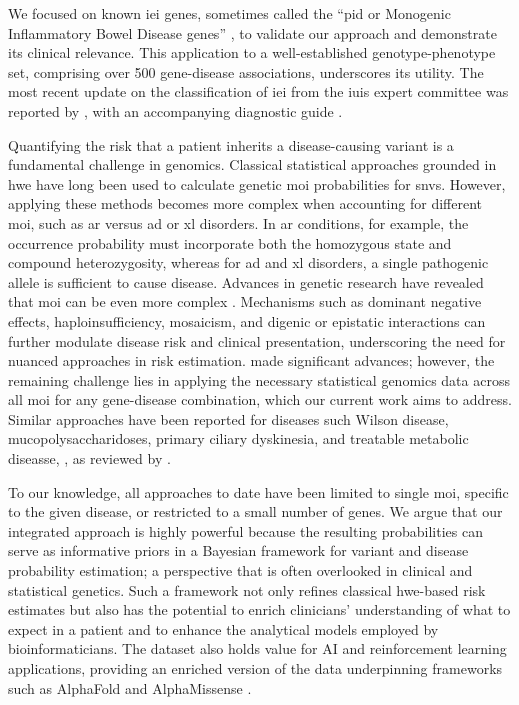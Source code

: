 We focused on known \ac{iei} genes, sometimes called the ``\ac{pid} or Monogenic Inflammatory Bowel Disease genes'' \cite{poli_human_2025, lawless_panelapprex_2025, martin_panelapp_2019},
to validate our approach and demonstrate its clinical relevance. 
This application to a well-established genotype-phenotype set, comprising over 500 gene-disease associations, underscores its utility.
The most recent update on the classification 
of \ac{iei} from the \ac{iuis}  expert committee was reported by \citet{poli_human_2025},
with an accompanying diagnostic guide \cite{bousfiha_2024_2025}.

Quantifying the risk that a patient inherits a disease-causing variant is a fundamental challenge in genomics. 
Classical statistical approaches grounded in \ac{hwe} \cite{MayoCentury2008, AbramovsHardyWeinberg2020} have long been used to calculate genetic \ac{moi} probabilities for \ac{snv}s. 
However, applying these methods becomes more complex when accounting for different \ac{moi}, such as \ac{ar} versus \ac{ad} or \ac{xl} disorders. 
In \ac{ar} conditions, for example, the occurrence probability must incorporate both the homozygous state and compound heterozygosity, whereas for \ac{ad} and \ac{xl} disorders, a single pathogenic allele is sufficient to cause disease. 
Advances in genetic research have revealed that \ac{moi} can be even more complex \cite{zschocke_mendelian_2023}. 
Mechanisms such as dominant negative effects, haploinsufficiency, mosaicism, and digenic or epistatic interactions can further modulate disease risk and clinical presentation, underscoring the need for nuanced approaches in risk estimation.
\citet{karczewski2020mutational} made significant advances; however, the remaining challenge lies in applying the necessary statistical genomics data across all \ac{moi} for any gene-disease combination,
which our current work aims to address.
Similar approaches have been reported for diseases such Wilson disease, mucopolysaccharidoses,  primary ciliary dyskinesia, and treatable metabolic diseasse, 
\cite{bick_estimating_2025, evans_estimating_2021}, 
as reviewed by \citet{hannah_using_2024}.

To our knowledge, all approaches to date have been limited to single \ac{moi}, specific to the given disease, or restricted to a small number of genes.
We argue that our integrated approach is highly powerful because the resulting probabilities can serve as informative priors in a Bayesian framework for variant and disease probability estimation; a perspective that is often overlooked in clinical and statistical genetics. 
Such a framework not only refines classical \ac{hwe}-based risk estimates but also has the potential to enrich clinicians’ understanding of what to expect in a patient and to enhance the analytical models employed by bioinformaticians.
The dataset also holds value for AI and reinforcement learning applications, providing an enriched version of the data underpinning frameworks such as AlphaFold \cite{jumper_highly_2021} and AlphaMissense \cite{cheng_accurate_2023}.

